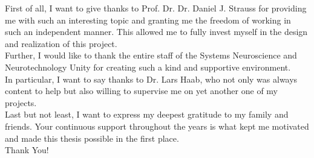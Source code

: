First of all, I want to give thanks to Prof. Dr. Dr. Daniel J. Strauss for providing me with such an interesting topic and granting me the freedom of working in such an independent manner. This allowed me to fully invest myself in the design and realization of this project.\\

Further, I would like to thank the entire staff of the Systems Neuroscience and Neurotechnology Unity for creating such a kind and supportive environment. \\
In particular, I want to say thanks to Dr. Lars Haab, who not only was always content to help but also willing to supervise me on yet another one of my projects.\\

Last but not least, I want to express my deepest gratitude to my family and friends. 
Your continuous support throughout the years is what kept me motivated and made this thesis possible in the first place.\\

Thank You!